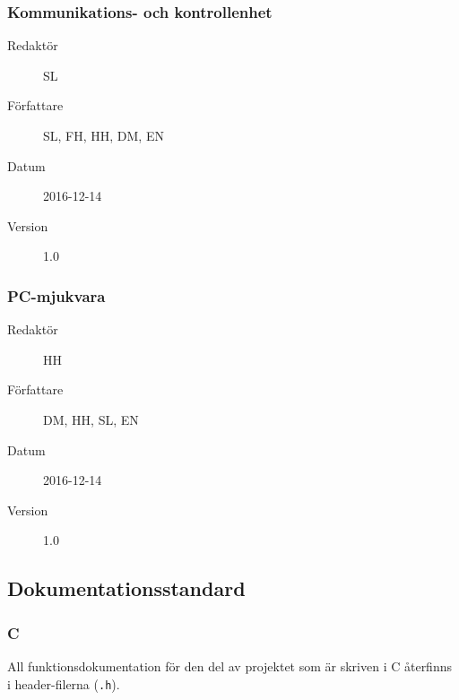 \documentclass[a4paper,11pt]{article}
\begin{document}
\subsubsection{Kommunikations- och kontrollenhet}

\begin{description}
\item[Redaktör] SL
\item[Författare] SL, FH, HH, DM, EN
\item[Datum] 2016-12-14
\item[Version] 1.0
\end{description}

\subsubsection{PC-mjukvara}

\begin{description}
\item[Redaktör] HH
\item[Författare] DM, HH, SL, EN
\item[Datum] 2016-12-14
\item[Version] 1.0
\end{description}


\subsection{Dokumentationsstandard}
\subsubsection{C}
All funktionsdokumentation för den del av projektet som är skriven i C återfinns i header-filerna (\texttt{.h}).
\end{document}
